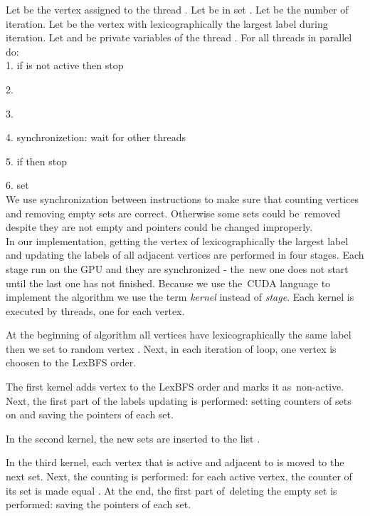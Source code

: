 \documentclass[a4paper, 11pt]{article}
\begin{document}
Let  be the vertex assigned to the thread . Let  be in set . Let  be the number 
of iteration. Let  be the vertex with lexicographically the largest label during  
iteration. Let  and  be private variables of the thread . 
For all threads  in parallel do:\\

\hspace{0.75cm} 1. if  is not active then stop

\hspace{0.75cm} 2. 

\hspace{0.75cm} 3. 

\hspace{0.75cm} 4. synchronizetion: wait for other threads

\hspace{0.75cm} 5. if  then stop

\hspace{0.75cm} 6. set \\

We use synchronization between instructions to make sure that counting vertices and removing 
empty sets are correct. Otherwise some sets could be~removed despite they are not empty and 
pointers could be changed improperly.\\
\newpage
In our implementation, getting the vertex of lexicographically the largest label and updating 
the labels of all adjacent vertices are performed in four stages. Each stage run on the GPU 
and they are synchronized - the~new one does not start until the last one has not finished. 
Because we use the~CUDA language to implement the algorithm we use the term \textit{kernel} 
instead of \textit{stage}. Each kernel is executed by  threads, one for each vertex.

At the beginning of algorithm all vertices have lexicographically the same label then we set 
 to random vertex . Next, in each iteration of  loop, one vertex is choosen 
to the LexBFS order. 

The first kernel adds  vertex to the LexBFS order and marks it as~non-active. Next,
the first part of the labels updating is performed: setting counters of sets on  and 
saving the  pointers of each set.

In the second kernel, the new sets are inserted to the list .

In the third kernel, each vertex that is active and adjacent to  is moved to the next 
set. Next, the counting is performed: for each active vertex, the counter of its set is made 
equal . At the end, the first part of~deleting the empty set is performed: saving the  
pointers of each set.
\end{document}
